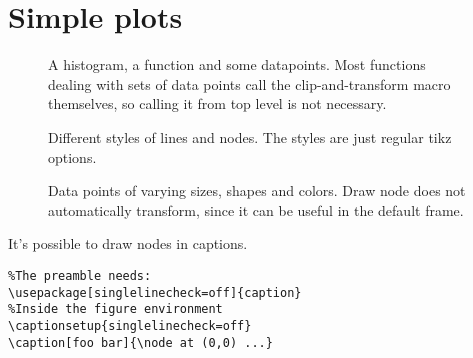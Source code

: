 \documentclass{article}
\begin{document}
\section{Simple plots}
\begin{figure}[H]
\centering

\captionsetup{singlelinecheck=off}
\caption[asdf]{A histogram, a function and some datapoints. Most functions 
dealing with sets of data points call the clip-and-transform macro themselves, so calling it from 
top level is not necessary.}
\end{figure}
\begin{figure}[H]
\centering

\captionsetup{singlelinecheck=off}
\caption[asdf]{Different styles of lines and nodes. The styles are just regular tikz options.}
\end{figure}
\begin{figure}[H]
\centering

\captionsetup{singlelinecheck=off}
\caption[asdf]{Data points of varying sizes, shapes and colors. Draw node does not automatically transform, 
since it can be useful in the default frame.}
\end{figure}
It's possible to draw nodes in captions. 
\begin{verbatim}
%The preamble needs:
\usepackage[singlelinecheck=off]{caption}
%Inside the figure environment
\captionsetup{singlelinecheck=off}
\caption[foo bar]{\node at (0,0) ...}
\end{verbatim}
\end{document}
